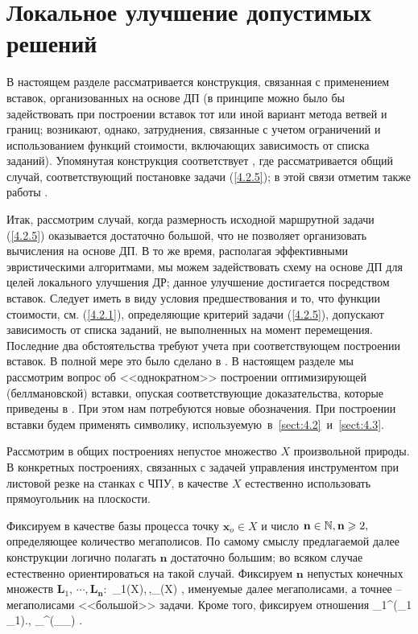 

\section{
  Локальное улучшение допустимых решений
}
\label{sect:4.4}
\setcounter{equation}{0}

В настоящем разделе рассматривается конструкция, связанная с применением вставок,
организованных на основе ДП
(в принципе можно было бы задействовать при построении
вставок тот или иной вариант метода ветвей и границ;
возникают, однако, затруднения,
связанные с учетом ограничений и использованием функций стоимости, включающих
зависимость от списка заданий).
Упомянутая конструкция соответствует \cite{Cha13`},
где рассматривается общий случай, соответствующий постановке задачи (\ref{4.2.5});
в этой связи отметим также работы
\cite{Cha14`,Cha15`}.

Итак, рассмотрим случай,
когда размерность исходной маршрутной задачи (\ref{4.2.5})
оказывается достаточно большой,
что не позволяет организовать вычисления на основе ДП.
В то же время, располагая эффективными эвристическими алгоритмами,
мы можем задействовать схему на основе ДП для целей локального улучшения ДР;
данное улучшение достигается посредством  вставок.
Следует иметь в виду условия предшествования и то,
что функции стоимости,
см. (\ref{4.2.1}),
определяющие критерий задачи (\ref{4.2.5}),
допускают зависимость от списка заданий,
не выполненных на момент перемещения.
Последние два обстоятельства требуют учета при соответствующем построении вставок.
В полной мере это было сделано в \cite{Cha13`, 15`}.
В настоящем разделе мы рассмотрим
вопрос об <<однократном>> построении оптимизирующей (беллмановской) вставки,
опуская соответствующие доказательства,
которые приведены в \cite{Cha13`, 15`}.
При этом нам потребуются новые обозначения.
При построении вставки будем применять
символику, используемую~в~\ref{sect:4.2}~и~\ref{sect:4.3}.

Рассмотрим в общих построениях непустое множество $X$
произвольной природы.
В конкретных построениях, связанных с задачей
управления инструментом при листовой резке на станках с ЧПУ,
в качестве $X$
естественно использовать прямоугольник на плоскости.

Фиксируем в качестве базы процесса точку
$\mathbf{x}_o\in X$ и число
$\mathbf{n}\in {\mathbb N}, \mathbf{n}\geqslant 2,$
определяющее количество мегаполисов.
По самому смыслу
предлагаемой далее конструкции логично полагать
$\mathbf{n}$ достаточно
большим;
во всяком случае естественно ориентироваться на такой случай.
Фиксируем $\mathbf{n}$ непустых конечных множеств
$\mathbf{L}_1,\,\cdots,\mathbf{L}_\mathbf{n}:$
\bfn
  \label{4.4.1}
  _1\in {}(X),\,\cdots,_\in {}(X)
  ,
\efn
именуемые далее мегаполисами,
а точнее --
мегаполисами <<большой>> задачи.
Кроме того, фиксируем отношения
\bfn
  \label{4.4.2}
  \bbl_1\in \cp^\prime(_1 \times {}_1).\cdots,
  \bbl_\in \cp^\prime(_\times {}_)
  .
\efn

